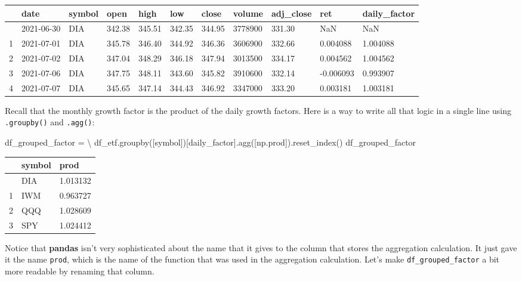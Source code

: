 \documentclass[
  letterpaper,
  DIV=11,
  numbers=noendperiod]{scrreprt}
\newenvironment{Shaded}{\begin{snugshade}}{\end{snugshade}}
\newcommand{\NormalTok}[1]{\textcolor[rgb]{0.00,0.23,0.31}{#1}}
\newcommand{\OperatorTok}[1]{\textcolor[rgb]{0.37,0.37,0.37}{#1}}
\newcommand{\StringTok}[1]{\textcolor[rgb]{0.13,0.47,0.30}{#1}}
\begin{document}
\begin{longtable}[]{@{}lllllllllll@{}}
\toprule\noalign{}
& date & symbol & open & high & low & close & volume & adj\_close & ret
& daily\_factor \\
\midrule\noalign{}
\endhead
\bottomrule\noalign{}
\endlastfoot
0 & 2021-06-30 & DIA & 342.38 & 345.51 & 342.35 & 344.95 & 3778900 &
331.30 & NaN & NaN \\
1 & 2021-07-01 & DIA & 345.78 & 346.40 & 344.92 & 346.36 & 3606900 &
332.66 & 0.004088 & 1.004088 \\
2 & 2021-07-02 & DIA & 347.04 & 348.29 & 346.18 & 347.94 & 3013500 &
334.17 & 0.004562 & 1.004562 \\
3 & 2021-07-06 & DIA & 347.75 & 348.11 & 343.60 & 345.82 & 3910600 &
332.14 & -0.006093 & 0.993907 \\
4 & 2021-07-07 & DIA & 345.65 & 347.14 & 344.43 & 346.92 & 3347000 &
333.20 & 0.003181 & 1.003181 \\
\end{longtable}

Recall that the monthly growth factor is the product of the daily growth
factors. Here is a way to write all that logic in a single line using
\texttt{.groupby()} and \texttt{.agg()}:

\begin{Shaded}
\begin{Highlighting}[]
\NormalTok{df\_grouped\_factor }\OperatorTok{=} \OperatorTok{\textbackslash{}}
\NormalTok{    df\_etf.groupby([}\StringTok{\textquotesingle{}symbol\textquotesingle{}}\NormalTok{])[}\StringTok{\textquotesingle{}daily\_factor\textquotesingle{}}\NormalTok{].agg([np.prod]).reset\_index()}
\NormalTok{df\_grouped\_factor}
\end{Highlighting}
\end{Shaded}

\begin{longtable}[]{@{}lll@{}}
\toprule\noalign{}
& symbol & prod \\
\midrule\noalign{}
\endhead
\bottomrule\noalign{}
\endlastfoot
0 & DIA & 1.013132 \\
1 & IWM & 0.963727 \\
2 & QQQ & 1.028609 \\
3 & SPY & 1.024412 \\
\end{longtable}

Notice that \textbf{pandas} isn't very sophisticated about the name that
it gives to the column that stores the aggregation calculation. It just
gave it the name \texttt{prod}, which is the name of the function that
was used in the aggregation calculation. Let's make
\texttt{df\_grouped\_factor} a bit more readable by renaming that
column.
\end{document}
